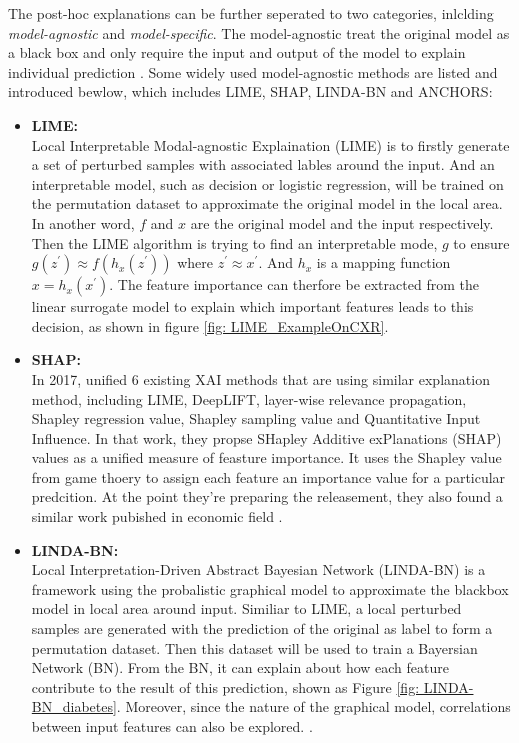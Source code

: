 The post-hoc explanations can be further seperated to two categories, inlclding \textit{model-agnostic} and \textit{model-specific}. The model-agnostic treat the original model as a black box and only require the input and output of the model to explain individual prediction \citep{Ribeiro2016Modelagnostic} \citep{Karlo2018XAISurvey} \citep{Ribeiro2018Anchors}. Some widely used model-agnostic methods are listed and introduced bewlow, which includes LIME\citep{Ribeiro2016LIME}, SHAP\citep{Lundberg2017SHAP}, LINDA-BN\citep{Moreira2021LINDA} and ANCHORS\citep{Ribeiro2018Anchors}:

\begin{itemize}
    \item \textbf{LIME:} \\ Local Interpretable Modal-agnostic Explaination (LIME) is to firstly generate a set of perturbed samples with associated lables around the input. And an interpretable model, such as decision or logistic regression, will be trained on the permutation dataset to approximate the original model in the local area. In another word, $f$ and $x$ are the original model and the input respectively. Then the LIME algorithm is trying to find an interpretable mode, $g$ to ensure $g(z^{'}) \approx f(h_{x}(z^{'}))$ where $z^{'} \approx x^{'}$. And $h_{x}$ is a mapping function $x = h_{x}(x^{'})$. The feature importance can therfore be extracted from the linear surrogate model to explain which important features leads to this decision, as shown in figure \ref{fig: LIME_ExampleOnCXR}.\\
    \item \textbf{SHAP:} \\ In 2017, \citet{Lundberg2017SHAP} unified 6 existing XAI methods that are using similar explanation method, including LIME, DeepLIFT, layer-wise relevance propagation, Shapley regression value, Shapley sampling value and Quantitative Input Influence. In that work, they propse SHapley Additive exPlanations (SHAP) values as a unified measure of feasture importance. It uses the Shapley value from game thoery to assign each feature an importance value for a particular predcition. At the point they're preparing the releasement, they also found a similar work pubished in economic field \citep{Charnes1988ShapeleyValueInEconomic}. \\
    \item \textbf{LINDA-BN:} \\ Local Interpretation-Driven Abstract Bayesian Network (LINDA-BN) is a framework using the probalistic graphical model to approximate the blackbox model in local area around input. Similiar to LIME, a local perturbed samples are generated with the prediction of the original as label to form a permutation dataset. Then this dataset will be used to train a Bayersian Network (BN). From the BN, it can explain about how each feature contribute to the result of this prediction, shown as Figure \ref{fig: LINDA-BN_diabetes}. Moreover, since the nature of the graphical model, correlations between input features can also be explored.  \citep{Moreira2021LINDA}.

\end{itemize}
